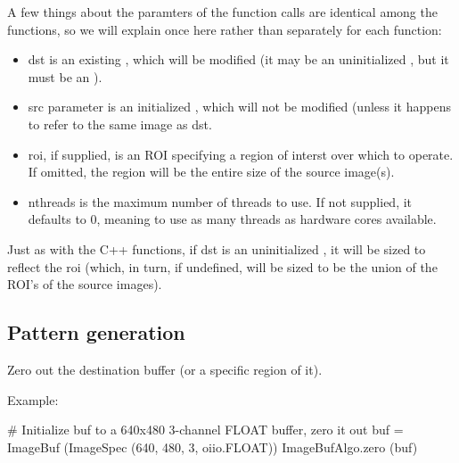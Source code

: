 A few things about the paramters of the \IBA function calls are identical
among the functions, so we will explain once here rather than separately for
each function:

\begin{itemize}
\item {\cf dst} is an existing \ImageBuf, which will be modified (it may be
an uninitialized \ImageBuf, but it must be an \ImageBuf).
\item {\cf src} parameter is an initialized \ImageBuf, which will not be
modified (unless it happens to refer to the same image as {\cf dst}.
\item {\cf roi}, if supplied, is an {\cf ROI} specifying a region of interst
over which to operate. If omitted, the region will be the entire size of the
source image(s).
\item {\cf nthreads} is the maximum number of threads to use. If not
supplied, it defaults to 0, meaning to use as many threads as hardware cores
available.
\end{itemize}

Just as with the C++ \IBA functions, if {\cf dst} is an uninitialized
\ImageBuf, it will be sized to reflect the {\cf roi} (which, in turn, if
undefined, will be sized to be the union of the ROI's of the source 
images).

\subsection{Pattern generation}
\label{sec:iba:py:patterns}

 

Zero out the destination buffer (or a specific region of it).

\smallskip
\noindent Example:
\begin{code}
    # Initialize buf to a 640x480 3-channel FLOAT buffer, zero it out
    buf = ImageBuf (ImageSpec (640, 480, 3, oiio.FLOAT))
    ImageBufAlgo.zero (buf)
\end{code}
\apiend

 

